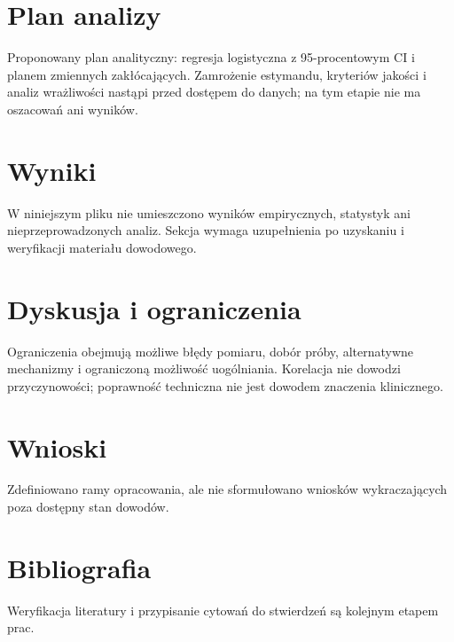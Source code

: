 \documentclass[11pt,a4paper]{article}
\begin{document}
\section{Plan analizy}

Proponowany plan analityczny: regresja logistyczna z 95-procentowym CI i planem zmiennych zakłócających. Zamrożenie estymandu, kryteriów jakości i analiz wrażliwości nastąpi przed dostępem do danych; na tym etapie nie ma oszacowań ani wyników.

\section{Wyniki}

W niniejszym pliku nie umieszczono wyników empirycznych, statystyk ani nieprzeprowadzonych analiz. Sekcja wymaga uzupełnienia po uzyskaniu i weryfikacji materiału dowodowego.

\section{Dyskusja i ograniczenia}

Ograniczenia obejmują możliwe błędy pomiaru, dobór próby, alternatywne mechanizmy i ograniczoną możliwość uogólniania. Korelacja nie dowodzi przyczynowości; poprawność techniczna nie jest dowodem znaczenia klinicznego.

\section{Wnioski}

Zdefiniowano ramy opracowania, ale nie sformułowano wniosków wykraczających poza dostępny stan dowodów.

\section*{Bibliografia}

Weryfikacja literatury i przypisanie cytowań do stwierdzeń są kolejnym etapem prac.
\end{document}
